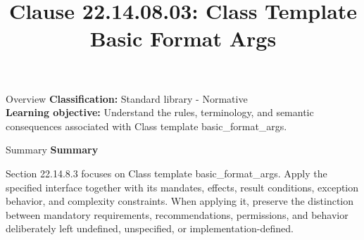 \documentclass[10pt,letterpaper]{article}
\title{Clause 22.14.08.03: Class Template Basic Format Args}
\author{}
\date{}
\begin{document}
\maketitle
\begin{CornellOverviewBox}{Overview}
\textbf{Classification:} Standard library - Normative\\[2pt]
\textbf{Learning objective:} Understand the rules, terminology, and semantic consequences associated with Class template basic\_format\_args.
\end{CornellOverviewBox}\begin{CornellSummaryBox}{Summary}
{\sffamily\bfseries\color{Accent} Summary}\par\vspace{3pt}Section 22.14.8.3 focuses on Class template basic\_format\_args. Apply the specified interface together with its mandates, effects, result conditions, exception behavior, and complexity constraints. When applying it, preserve the distinction between mandatory requirements, recommendations, permissions, and behavior deliberately left undefined, unspecified, or implementation-defined.
\end{CornellSummaryBox}
\end{document}
